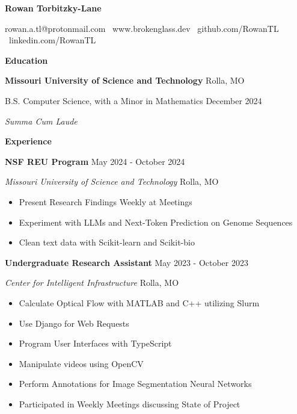 \documentclass[11pt]{article}
\begin{document}
\begin{center}
    \textbf{\huge Rowan Torbitzky-Lane}\\
    \hrulefill
\end{center}

\begin{center}
    rowan.a.tl@protonmail.com \textbullet \ www.brokenglass.dev \textbullet \ github.com/RowanTL \textbullet  \ linkedin.com/RowanTL
\end{center}


\begin{center}
    \textbf{Education}
\end{center}
\textbf{Missouri University of Science and Technology} \hfill Rolla, MO

B.S. Computer Science, with a Minor in Mathematics \hfill December 2024

\textit{Summa Cum Laude}


\begin{center}
    \textbf{Experience}
\end{center}

\textbf{NSF REU Program} \hfill May 2024 - October 2024

\textsl{Missouri University of Science and Technology} \hfill Rolla, MO
\begin{itemize}[noitemsep]
    \item Present Research Findings Weekly at Meetings
    \item Experiment with LLMs and Next-Token Prediction on Genome Sequences
    \item Clean text data with Scikit-learn and Scikit-bio
\end{itemize}

\textbf{Undergraduate Research Assistant} \hfill May 2023 - October 2023

\textsl{Center for Intelligent Infrastructure} \hfill Rolla, MO
\begin{itemize}[noitemsep]
    \item Calculate Optical Flow with MATLAB and C++ utilizing Slurm
    \item Use Django for Web Requests
    \item Program User Interfaces with TypeScript
    \item Manipulate videos using OpenCV
    \item Perform Annotations for Image Segmentation Neural Networks
    \item Participated in Weekly Meetings discussing State of Project
\end{itemize}
\end{document}
